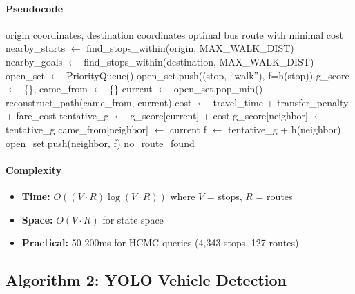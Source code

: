 \paragraph{Pseudocode}

\begin{algorithm}[H]
\caption{A* Bus Routing}
\begin{algorithmic}[1]
\REQUIRE origin coordinates, destination coordinates
\ENSURE optimal bus route with minimal cost
\STATE nearby\_starts $\gets$ find\_stops\_within(origin, MAX\_WALK\_DIST)
\STATE nearby\_goals $\gets$ find\_stops\_within(destination, MAX\_WALK\_DIST)
\STATE open\_set $\gets$ PriorityQueue()
    \STATE open\_set.push((stop, ``walk''), f=h(stop))
\ENDFOR
\STATE g\_score $\gets$ \{\}, came\_from $\gets$ \{\}
    \STATE current $\gets$ open\_set.pop\_min()
        \RETURN reconstruct\_path(came\_from, current)
    \ENDIF
        \STATE cost $\gets$ travel\_time + transfer\_penalty + fare\_cost
        \STATE tentative\_g $\gets$ g\_score[current] + cost
            \STATE g\_score[neighbor] $\gets$ tentative\_g
            \STATE came\_from[neighbor] $\gets$ current
            \STATE f $\gets$ tentative\_g + h(neighbor)
            \STATE open\_set.push(neighbor, f)
        \ENDIF
    \ENDFOR
\ENDWHILE
\RETURN no\_route\_found
\end{algorithmic}
\end{algorithm}

\paragraph{Complexity}
\begin{itemize}[noitemsep]
    \item \textbf{Time:} $O((V \cdot R) \log (V \cdot R))$ where $V$ = stops, $R$ = routes
    \item \textbf{Space:} $O(V \cdot R)$ for state space
    \item \textbf{Practical:} 50-200ms for HCMC queries (4,343 stops, 127 routes)
\end{itemize}

\subsection{Algorithm 2: YOLO Vehicle Detection}

